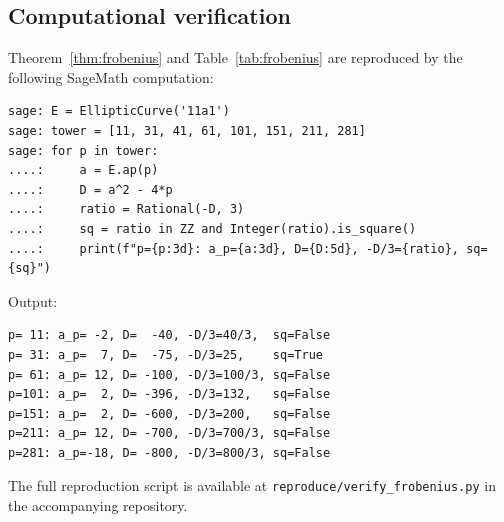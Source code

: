 \subsection{Computational verification}
\label{subsec:computation}

Theorem~\ref{thm:frobenius} and Table~\ref{tab:frobenius} are reproduced
by the following SageMath computation:

\begin{verbatim}
sage: E = EllipticCurve('11a1')
sage: tower = [11, 31, 41, 61, 101, 151, 211, 281]
sage: for p in tower:
....:     a = E.ap(p)
....:     D = a^2 - 4*p
....:     ratio = Rational(-D, 3)
....:     sq = ratio in ZZ and Integer(ratio).is_square()
....:     print(f"p={p:3d}: a_p={a:3d}, D={D:5d}, -D/3={ratio}, sq={sq}")
\end{verbatim}

Output:
\begin{verbatim}
p= 11: a_p= -2, D=  -40, -D/3=40/3,  sq=False
p= 31: a_p=  7, D=  -75, -D/3=25,    sq=True
p= 61: a_p= 12, D= -100, -D/3=100/3, sq=False
p=101: a_p=  2, D= -396, -D/3=132,   sq=False
p=151: a_p=  2, D= -600, -D/3=200,   sq=False
p=211: a_p= 12, D= -700, -D/3=700/3, sq=False
p=281: a_p=-18, D= -800, -D/3=800/3, sq=False
\end{verbatim}

The full reproduction script is available at
\texttt{reproduce/verify\_frobenius.py} in the accompanying repository.
